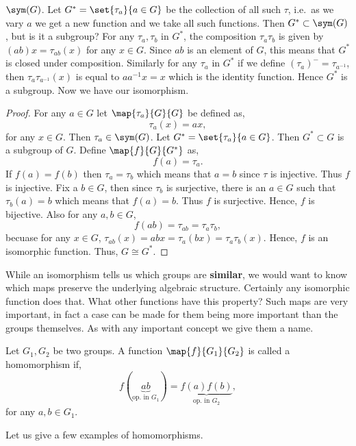 $\sym(G)$. Let $G^{\ast} = \set{\tau_{a}}{a\in G}$ be the collection of all such $\tau$, i.e.~as we vary $a$ 
we get a new function and we take all such functions. Then $G^{\ast} \subset \sym(G)$, but is it a subgroup?
For any $\tau_{a},\tau_{b}$ in $G^{\ast}$,
the composition $\tau_{a}\tau_{b}$ is given by $(ab)x = \tau_{ab}(x)$ 
for any $x \in G$. Since $ab$ is an element of $G$,
this means that $G^{\ast}$ is closed under composition. Similarly for any $\tau_{a}$ in $G^{\ast}$ if we
define ${(\tau_{a})}^{-} = \tau_{a^{-1}}$, then $\tau_{a}\tau_{a^{-1}}(x)$ is equal to $aa^{-1}x = x$ which is
the identity function. Hence $G^{\ast}$ is a subgroup. Now we have our isomorphism.
\begin{proof}
    For any $a \in G$ let $\map{\tau_{a}}{G}{G}$ be defined as,
    \[\tau_{a}(x) = ax,\]
    for any $x \in G$. Then $\tau_{a} \in \sym(G)$. Let $G^{\ast} = \set{\tau_{a}}{a\in G}$. Then $G^{\ast}
    \subset G$ is a subgroup of $G$. Define $\map{f}{G}{G^{\ast}}$ as,
    \[f(a) = \tau_{a}.\]
    If $f(a) = f(b)$ then $\tau_{a} = \tau_{b}$ which means that $a = b$ since $\tau$ is injective. Thus $f$
    is injective. Fix a $b
    \in G$, then since $\tau_{b}$ is surjective, there is an $a \in G$ such that $\tau_{b}(a) = b$ which means
    that $f(a) = b$. Thus $f$ is surjective. Hence, $f$ is bijective.
    Also for any $a,b \in G$,
    \[f(ab) = \tau_{ab} = \tau_{a}\tau_{b},\]
    becuase for any $x \in G$, $\tau_{ab}(x) = abx = \tau_{a}(bx) = \tau_{a}\tau_{b}(x)$. Hence, $f$ is an
    isomorphic function. Thus, $G\cong G^{\ast}$.
\end{proof}
While an isomorphism tells us which groups are \textbf{similar}, we would want to know which maps 
preserve the underlying algebraic structure. Certainly any isomorphic function does that. What other functions
have this property? Such maps are very important, in fact a case can be made for them
being more important than the groups themselves. As with any important concept we give them a name.
\begin{Definition}[name=Homomorphism]
    Let $G_1,G_2$ be two groups. A function \break{}$\map{f}{G_1}{G_2}$ is called a homomorphism if,
    \[f(\underbrace{ab}_{\text{op.~in $G_1$}}) = \underbrace{f(a)f(b)}_{\text{op.~in $G_2$}},\]
    for any $a,b \in G_1$. 
\end{Definition}
Let us give a few examples of homomorphisms.
